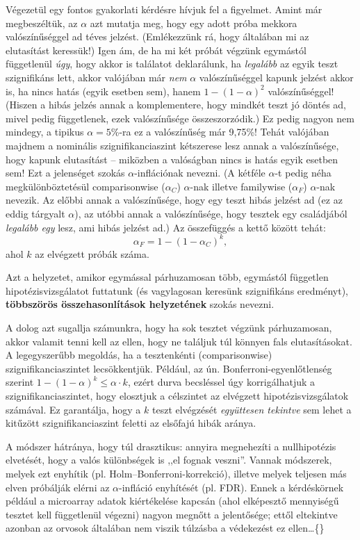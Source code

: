 \documentclass[
]{book}
\begin{document}
Végezetül egy fontos gyakorlati kérdésre hívjuk fel a figyelmet. Amint már megbeszéltük, az \(\alpha\) azt mutatja meg, hogy egy adott próba mekkora valószínűséggel ad téves jelzést. (Emlékezzünk rá, hogy általában mi az elutasítást keressük!) Igen ám, de ha mi két próbát végzünk egymástól függetlenül \emph{úgy}, hogy akkor is találatot deklarálunk, ha \emph{legalább} az egyik teszt szignifikáns lett, akkor valójában már \emph{nem} \(\alpha\) valószínűséggel kapunk jelzést akkor is, ha nincs hatás (egyik esetben sem), hanem \(1-\left(1-\alpha\right)^2\) valószínűséggel! (Hiszen a hibás jelzés annak a komplementere, hogy mindkét teszt jó döntés ad, mivel pedig függetlenek, ezek valószínűsége összeszorzódik.) Ez pedig nagyon nem mindegy, a tipikus \(\alpha=5\)\%-ra ez a valószínűség már 9,75\%! Tehát valójában majdnem a nominális szignifikanciaszint kétszerese lesz annak a valószínűsége, hogy kapunk elutasítást -- miközben a valóságban nincs is hatás egyik esetben sem! Ezt a jelenséget szokás \(\alpha\)-inflációnak nevezni. (A kétféle \(\alpha\)-t pedig néha megkülönböztetésül comparisonwise (\(\alpha_C\)) \(\alpha\)-nak illetve familywise (\(\alpha_F\)) \(\alpha\)-nak nevezik. Az előbbi annak a valószínűsége, hogy egy teszt hibás jelzést ad (ez az eddig tárgyalt \(\alpha\)), az utóbbi annak a valószínűsége, hogy tesztek egy családjából \emph{legalább egy} lesz, ami hibás jelzést ad.) Az összefüggés a kettő között tehát:
\[
    \alpha_F = 1-\left(1-\alpha_C\right)^k,
\]
ahol \(k\) az elvégzett próbák száma.

Azt a helyzetet, amikor egymással párhuzamosan több, egymástól független hipotézisvizsgálatot futtatunk (és vagylagosan keresünk szignifikáns eredményt), \textbf{többszörös összehasonlítások helyzetének} szokás nevezni.

A dolog azt sugallja számunkra, hogy ha sok tesztet végzünk párhuzamosan, akkor valamit tenni kell az ellen, hogy ne találjuk túl könnyen fals elutasításokat. A legegyszerűbb megoldás, ha a tesztenkénti (comparisonwise) szignifikanciaszintet lecsökkentjük. Például, az ún. Bonferroni-egyenlőtlenség szerint \(1-\left(1-\alpha\right)^k\leq \alpha\cdot k\), ezért durva becsléssel úgy korrigálhatjuk a szignifikanciaszintet, hogy elosztjuk a célszintet az elvégzett hipotézisvizsgálatok számával. Ez garantálja, hogy a \(k\) teszt elvégzését \emph{együttesen tekintve} sem lehet a kitűzött szignifikanciaszint feletti az elsőfajú hibák aránya.

A módszer hátránya, hogy túl drasztikus: annyira megnehezíti a nullhipotézis elvetését, hogy a valós különbségek is ,,el fognak veszni''. Vannak módszerek, melyek ezt enyhítik (pl. Holm--Bonferroni-korrekció), illetve melyek teljesen más elven próbálják elérni az \(\alpha\)-infláció enyhítését (pl. FDR). Ennek a kérdéskörnek például a microarray adatok kiértékelése kapcsán (ahol elképesztő mennyiségű tesztet kell függetlenül végezni) nagyon megnőtt a jelentősége; ettől eltekintve azonban az orvosok általában nem viszik túlzásba a védekezést ez ellen\dots\{\}
\end{document}
